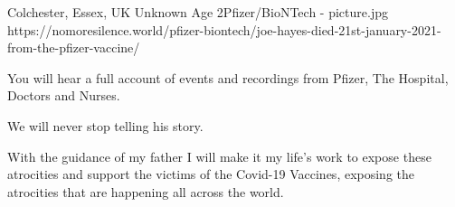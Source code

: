{Colchester, Essex, UK}
{Unknown Age}
{2Pfizer/BioNTech}
{}
{-}
{picture.jpg}
{https://nomoresilence.world/pfizer-biontech/joe-hayes-died-21st-january-2021-from-the-pfizer-vaccine/}
{


You will hear a full account of events and recordings from Pfizer, The Hospital, Doctors and Nurses.

We will never stop telling his story.

With the guidance of my father I will make it my life’s work to expose these atrocities and support the victims of the Covid-19 Vaccines, exposing the atrocities that are happening all across the world.
}

